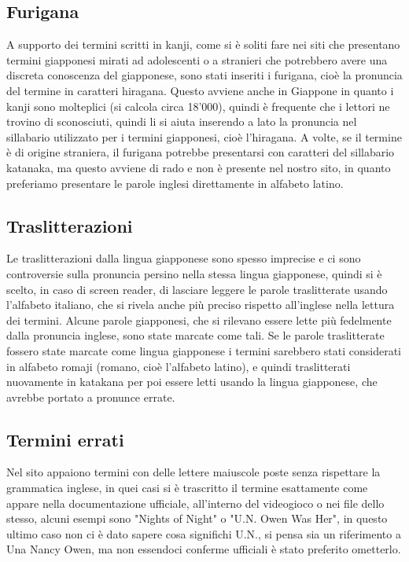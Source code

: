 \documentclass[openany, a4paper, 12pt]{report}
\begin{document}
			\subsection{Furigana}
				A supporto dei termini scritti in kanji, come si è soliti fare nei siti che presentano termini giapponesi mirati ad adolescenti o a stranieri che potrebbero avere una discreta conoscenza del giapponese, sono stati inseriti i furigana, cioè la pronuncia del termine in caratteri hiragana.
				Questo avviene anche in Giappone in quanto i kanji sono molteplici (si calcola circa 18'000), quindi è frequente che i lettori ne trovino di sconosciuti, quindi li si aiuta inserendo a lato la pronuncia nel sillabario utilizzato per i termini giapponesi, cioè l'hiragana.
				A volte, se il termine è di origine straniera, il furigana potrebbe presentarsi con caratteri del sillabario katanaka, ma questo avviene di rado e non è presente nel nostro sito, in quanto preferiamo presentare le parole inglesi direttamente in alfabeto latino. 
			\subsection{Traslitterazioni}
				Le traslitterazioni dalla lingua giapponese sono spesso imprecise e ci sono controversie sulla pronuncia persino nella stessa lingua giapponese, quindi si è scelto, in caso di screen reader, di lasciare leggere le parole traslitterate usando l'alfabeto italiano, che si rivela anche più preciso rispetto all'inglese nella lettura dei termini.
				Alcune parole giapponesi, che si rilevano essere lette più fedelmente dalla pronuncia inglese, sono state marcate come tali.
				Se le parole traslitterate fossero state marcate come lingua giapponese i termini sarebbero stati considerati in alfabeto romaji (romano, cioè l'alfabeto latino), e quindi traslitterati nuovamente in katakana per poi essere letti usando la lingua giapponese, che avrebbe portato a pronunce errate.
			\subsection{Termini errati}
				Nel sito appaiono termini con delle lettere maiuscole poste senza rispettare la grammatica inglese, in quei casi si è trascritto il termine esattamente come appare nella documentazione ufficiale, all'interno del videogioco o nei file dello stesso, alcuni esempi sono "Nights of Night" o "U.N. Owen Was Her", in questo ultimo caso non ci è dato sapere cosa significhi U.N., si pensa sia un riferimento a Una Nancy Owen, ma non essendoci conferme ufficiali è stato preferito ometterlo.\\
			
\end{document}
